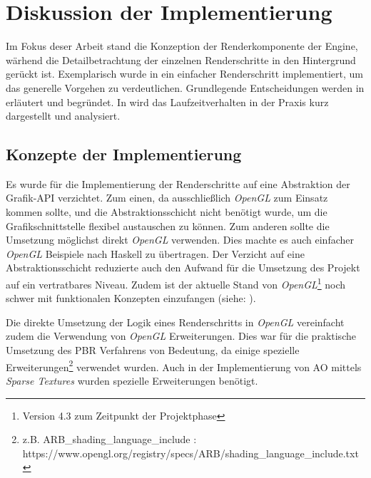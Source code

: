 \section{Diskussion der Implementierung}\label{sec:diskussion-impl}

Im Fokus deser Arbeit stand die Konzeption der Renderkomponente der Engine, wärhend die Detailbetrachtung der einzelnen Renderschritte in den Hintergrund gerückt ist. Exemplarisch wurde in  ein einfacher Renderschritt implementiert, um das generelle Vorgehen zu verdeutlichen. Grundlegende Entscheidungen werden in  erläutert und begründet. In  wird das Laufzeitverhalten in der Praxis kurz dargestellt und analysiert.

\subsection{Konzepte der Implementierung}\label{sec:konzepte-impl}

Es wurde für die Implementierung der Renderschritte auf eine Abstraktion der Grafik-\ac{API} verzichtet. Zum einen, da ausschließlich \textit{OpenGL} zum Einsatz kommen sollte, und die Abstraktionsschicht nicht benötigt wurde, um die Grafikschnittstelle flexibel austauschen zu können. Zum anderen sollte die Umsetzung möglichst direkt \textit{OpenGL} verwenden. Dies machte es auch einfacher \textit{OpenGL} Beispiele nach Haskell zu übertragen. Der Verzicht auf eine Abstraktionsschicht reduzierte auch den Aufwand für die Umsetzung des Projekt auf ein vertratbares Niveau. Zudem ist der aktuelle Stand von \textit{OpenGL}\footnote{Version 4.3 zum Zeitpunkt der Projektphase} noch schwer mit funktionalen Konzepten einzufangen (siehe: ).

Die direkte Umsetzung der Logik eines Renderschritts in \textit{OpenGL} vereinfacht zudem die Verwendung von \textit{OpenGL} Erweiterungen. Dies war für die praktische Umsetzung des \ac{PBR} Verfahrens von Bedeutung, da einige spezielle Erweiterungen\footnote{z.B. ARB\_shading\_language\_include : https://www.opengl.org/registry/specs/ARB/shading\_language\_include.txt} verwendet wurden. Auch in der Implementierung von \acf{AO} mittels \textit{Sparse Textures} wurden spezielle Erweiterungen benötigt.

